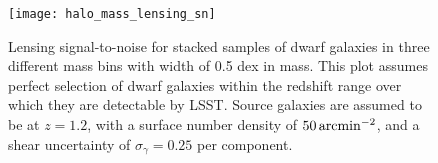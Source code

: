 
\begin{figure}
\centering
\texttt{[image: halo\_mass\_lensing\_sn]}
\caption{
\label{fig:dwarf_sn} Lensing signal-to-noise for stacked samples of dwarf galaxies in three different mass bins with width of 0.5 dex in mass. 
This plot assumes perfect selection of dwarf galaxies within the redshift range over which they are detectable by LSST. 
Source galaxies are assumed to be at $z=1.2$, with a surface number density of $50 \mathrm{\,arcmin}^{-2}$, and a shear uncertainty of $\sigma_\gamma = 0.25$ per component.}
\end{figure}
